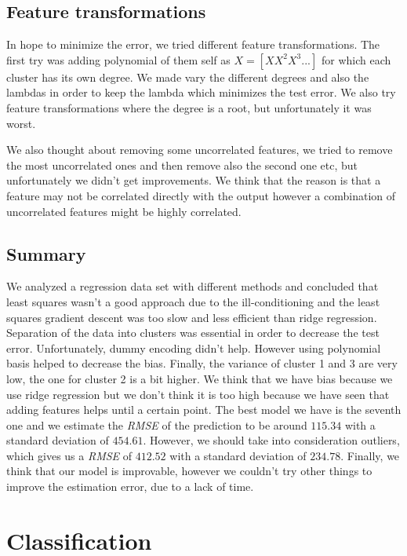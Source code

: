 \documentclass{article} %
\begin{document}
\subsection{Feature transformations}

In hope to minimize the error, we tried different feature transformations. The first try was adding polynomial of them self as $X = [X X^2 X^3 ...]$ for which each cluster has its own degree. We made vary the different degrees and also the lambdas in order to keep the lambda which minimizes the test error. We also try feature transformations where the degree is a root, but unfortunately it was worst.

We also thought about removing some uncorrelated features, we tried to remove the most uncorrelated ones and then remove also the second one etc, but unfortunately we didn't get improvements. We think that the reason is that a feature may not be correlated directly with the output however a combination of uncorrelated features might be highly correlated. 

\subsection{Summary}

We analyzed a regression data set with different methods and concluded that least squares wasn't a good approach due to the ill-conditioning and the least squares gradient descent was too slow and less efficient than ridge regression. Separation of the data into clusters was essential in order to decrease the test error. Unfortunately, dummy encoding didn't help. However using polynomial basis helped to decrease the bias. Finally, the variance of cluster 1 and 3 are very low, the one for cluster 2 is a bit higher. We think that we have bias because we use ridge regression but we don't think it is too high because we have seen that adding features helps until a certain point. The best model we have is the seventh one and we estimate the \textit{RMSE} of the prediction to be around $115.34$ with a standard deviation of $454.61$. However, we should take into consideration outliers, which gives us a \textit{RMSE} of $412.52$ with a standard deviation of $234.78$. Finally, we think that our model is improvable, however we couldn't try other things to improve the estimation error, due to a lack of time.

\section{Classification}
\end{document}
